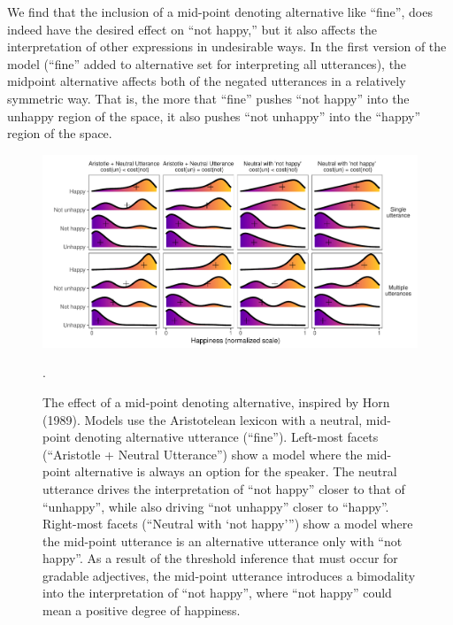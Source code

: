 \documentclass[floatsintext,doc]{apa6}
\begin{document}
We find that the inclusion of a mid-point denoting alternative like ``fine'', does indeed have
the desired effect on ``not happy,'' but it also affects the interpretation of other
expressions in undesirable ways.
In the first version of the model (``fine'' added to alternative set for interpreting all utterances), the midpoint alternative affects both of the negated utterances in a relatively symmetric way.
That is, the more that ``fine'' pushes ``not happy'' into the unhappy region of the space, it also pushes ``not unhappy'' into the ``happy'' region of the space. 

\begin{figure}[t]
\centering \includegraphics{figs/horn_SI.pdf} 
\caption{The effect of a mid-point denoting alternative, inspired by Horn (1989). Models use the Aristotelean lexicon with a neutral, mid-point denoting alternative utterance (``fine''). Left-most facets (``Aristotle + Neutral Utterance'') show a model where  the mid-point alternative is always an option for the speaker. The neutral utterance drives the interpretation of ``not happy'' closer to that of ``unhappy'', while also driving ``not unhappy'' closer to ``happy''. Right-most facets (``Neutral  with `not happy''') show a model where the mid-point utterance is an alternative utterance only with ``not happy''. As a result of the threshold inference that must occur for gradable adjectives, the mid-point utterance introduces a bimodality into the interpretation of ``not happy'', where ``not happy'' could mean a positive degree of happiness.}.\label{fig:horn}
\end{figure}
\end{document}
